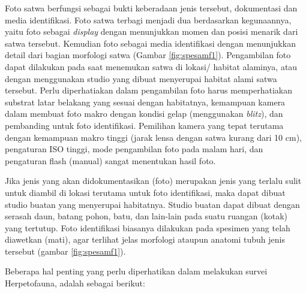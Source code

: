 \documentclass[
  oneside]{book}
\begin{document}
Foto satwa berfungsi sebagai bukti keberadaan jenis tersebut, dokumentasi dan media identifikasi. Foto satwa terbagi menjadi dua berdasarkan kegunaannya, yaitu foto sebagai \emph{display} dengan menunjukkan momen dan posisi menarik dari satwa tersebut. Kemudian foto sebagai media identifikasi dengan menunjukkan detail dari bagian morfologi satwa (Gambar \ref{fig:spesamf1}). Pengambilan foto dapat dilakukan pada saat menemukan satwa di lokasi/ habitat alaminya, atau dengan menggunakan studio yang dibuat menyerupai habitat alami satwa tersebut. Perlu diperhatiakan dalam pengambilan foto harus memperhatiakan substrat latar belakang yang sesuai dengan habitatnya, kemampuan kamera dalam membuat foto makro dengan kondisi gelap (menggunakan \emph{blitz}), dan pembanding untuk foto identifikasi. Pemilihan kamera yang tepat terutama dengan kemampuan makro tinggi (jarak lensa dengan satwa kurang dari 10 cm), pengaturan ISO tinggi, mode pengambilan foto pada malam hari, dan pengaturan flash (manual) sangat menentukan hasil foto.

Jika jenis yang akan didokumentasikan (foto) merupakan jenis yang terlalu sulit untuk diambil di lokasi terutama untuk foto identifikasi, maka dapat dibuat studio buatan yang menyerupai habitatnya. Studio buatan dapat dibuat dengan serasah daun, batang pohon, batu, dan lain-lain pada suatu ruangan (kotak) yang tertutup. Foto identifikasi biasanya dilakukan pada spesimen yang telah diawetkan (mati), agar terlihat jelas morfologi ataupun anatomi tubuh jenis tersebut (gambar \ref{fig:spesamf1}).

Beberapa hal penting yang perlu diperhatikan dalam melakukan survei Herpetofauna, adalah sebagai berikut:
\end{document}
